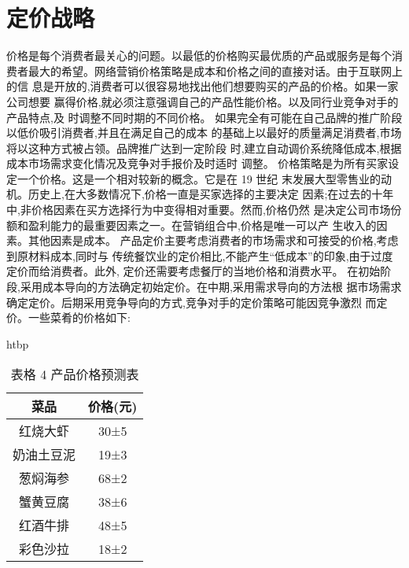 \section{定价战略}
价格是每个消费者最关心的问题。以最低的价格购买最优质的产品或服务是每个消
费者最大的希望。网络营销价格策略是成本和价格之间的直接对话。由于互联网上的信
息是开放的,消费者可以很容易地找出他们想要购买的产品的价格。如果一家公司想要
赢得价格,就必须注意强调自己的产品性能价格。以及同行业竞争对手的产品特点,及
时调整不同时期的不同价格。
如果完全有可能在自己品牌的推广阶段以低价吸引消费者,并且在满足自己的成本
的基础上以最好的质量满足消费者,市场将以这种方式被占领。品牌推广达到一定阶段
时,建立自动调价系统降低成本,根据成本市场需求变化情况及竞争对手报价及时适时
调整。
价格策略是为所有买家设定一个价格。这是一个相对较新的概念。它是在 19 世纪
末发展大型零售业的动机。历史上,在大多数情况下,价格一直是买家选择的主要决定
因素;在过去的十年中,非价格因素在买方选择行为中变得相对重要。然而,价格仍然
是决定公司市场份额和盈利能力的最重要因素之一。在营销组合中,价格是唯一可以产
生收入的因素。其他因素是成本。
产品定价主要考虑消费者的市场需求和可接受的价格,考虑到原材料成本,同时与
传统餐饮业的定价相比,不能产生“低成本”的印象,由于过度定价而给消费者。此外,
定价还需要考虑餐厅的当地价格和消费水平。
在初始阶段,采用成本导向的方法确定初始定价。在中期,采用需求导向的方法根
据市场需求确定定价。后期采用竞争导向的方式,竞争对手的定价策略可能因竞争激烈
而定价。一些菜肴的价格如下:

\begin{table}{htbp}
\caption{表格 4 产品价格预测表}
\begin{tabular}{|c|c|}
\hline
菜品&价格(元)\\ \hline
红烧大虾&30±5\\ \hline
奶油土豆泥&19±3\\ \hline
葱焖海参&68±2\\ \hline
蟹黄豆腐&38±6\\ \hline
红酒牛排&48±5\\ \hline
彩色沙拉&18±2\\ \hline
\end{tabular}
\end{table}
